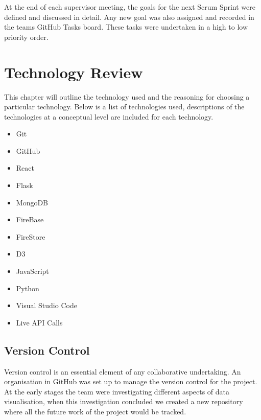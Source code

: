 \vspace{5mm} %

At the end of each supervisor meeting, the goals for the next Scrum Sprint were defined and discussed in detail. Any new goal was also assigned and recorded in the teams GitHub Tasks board. These tasks were undertaken in a high to low priority order.

\vspace{70mm} %


\chapter{Technology Review}
This chapter will outline the technology used and the reasoning for choosing a particular technology. Below is a list of technologies used, descriptions of the technologies at a conceptual level are included for each technology.
\begin{itemize}
\item Git
\item GitHub
\item React
\item Flask
\item MongoDB
\item FireBase
\item FireStore
\item D3
\item JavaScript
\item Python
\item Visual Studio Code
\item Live API Calls

\end{itemize}

\section{Version Control}
Version control is an essential element of any collaborative undertaking. An organisation in GitHub was set up to manage the version control for the project. At the early stages the team were investigating different aspects of data visualisation, when this investigation concluded we created a new repository where all the future work of the project would be tracked.
